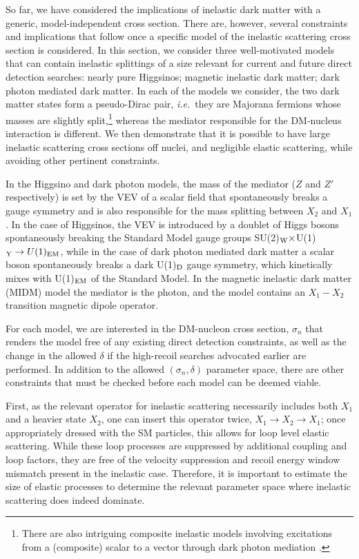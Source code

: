 \documentclass[11pt]{article}
\newcommand{\ie}{{\it i.e.}}
\begin{document}
So far, we have considered the implications of inelastic dark matter 
with a generic, model-independent cross section.  There are, however,
several constraints and implications that follow once a specific
model of the inelastic scattering cross section is considered.
In this section, we consider three well-motivated models that can contain
inelastic splittings of a size relevant for current and future
direct detection searches:  nearly pure Higgsinos; magnetic 
inelastic dark matter; dark photon mediated dark matter. 
In each of the models we consider, the two dark matter
states form a pseudo-Dirac pair, \ie\ they are Majorana fermions whose 
masses are slightly split,\footnote{There are also 
intriguing composite inelastic models involving excitations
from a (composite) scalar to a vector through dark photon 
mediation \cite{Alves:2009nf,Lisanti:2009am}.} 
whereas the mediator responsible for the 
DM-nucleus interaction is different.
We then demonstrate that it is possible to have large
inelastic scattering cross sections off nuclei, and negligible 
elastic scattering, while avoiding other pertinent constraints.  

In the Higgsino and dark photon models, the mass of the mediator ($Z$ and $Z'$ respectively) is set by the VEV of a scalar field that spontaneously breaks a gauge symmetry and is also responsible for the mass splitting between $X_2$ and $X_1$.  In the case of Higgsinos, the VEV is introduced by a doublet of Higgs bosons spontaneously breaking the Standard Model gauge groups SU(2)$_{\rm W} \times$U(1)$_{\rm Y} \rightarrow U(1)_{\rm EM}$, while in the case of dark photon mediated dark matter a scalar boson spontaneously breaks a dark U(1)$_{\rm D}$ gauge symmetry, which kinetically mixes with U(1)$_{\rm EM}$ of the Standard Model. In the magnetic inelastic dark matter (MIDM) model the mediator is the photon, and the model contains an $X_1-X_2$ transition magnetic dipole operator.

For each model, we are interested in the DM-nucleon cross section, $\sigma_n$ that renders the model free of any existing direct detection constraints, as well as the change in the allowed $\delta$ if the high-recoil searches advocated earlier are performed.  In addition to the allowed $(\sigma_n, \delta)$ parameter space, there are other constraints that must be checked before each model can be deemed viable.

First, as the relevant operator for inelastic scattering necessarily includes both $X_1$ and a heavier state $X_2$, one can insert this operator twice, $X_1 \to X_2 \to X_1$; once appropriately dressed with the SM particles, this allows for loop level elastic scattering. While these loop processes are suppressed by additional coupling and loop factors, they are free of the velocity suppression and recoil energy window mismatch present in the inelastic case. Therefore, it is important to estimate the size of elastic processes to determine the relevant parameter space where inelastic scattering does indeed dominate.
\end{document}

